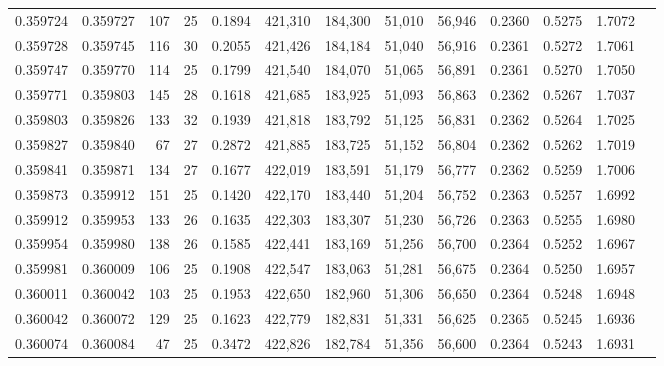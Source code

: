\begin{tabular}{rrrrrrrrrrrrr}
0.359724 & 0.359727 &   107 &  25 &                                     0.1894 & 421,310 & 184,300 &  51,010 &  56,946 & 0.2360 & 0.5275 & 1.7072 \\
0.359728 & 0.359745 &   116 &  30 &                                     0.2055 & 421,426 & 184,184 &  51,040 &  56,916 & 0.2361 & 0.5272 & 1.7061 \\
0.359747 & 0.359770 &   114 &  25 &                                     0.1799 & 421,540 & 184,070 &  51,065 &  56,891 & 0.2361 & 0.5270 & 1.7050 \\
0.359771 & 0.359803 &   145 &  28 &                                     0.1618 & 421,685 & 183,925 &  51,093 &  56,863 & 0.2362 & 0.5267 & 1.7037 \\
0.359803 & 0.359826 &   133 &  32 &                                     0.1939 & 421,818 & 183,792 &  51,125 &  56,831 & 0.2362 & 0.5264 & 1.7025 \\
0.359827 & 0.359840 &    67 &  27 &                                     0.2872 & 421,885 & 183,725 &  51,152 &  56,804 & 0.2362 & 0.5262 & 1.7019 \\
0.359841 & 0.359871 &   134 &  27 &                                     0.1677 & 422,019 & 183,591 &  51,179 &  56,777 & 0.2362 & 0.5259 & 1.7006 \\
0.359873 & 0.359912 &   151 &  25 &                                     0.1420 & 422,170 & 183,440 &  51,204 &  56,752 & 0.2363 & 0.5257 & 1.6992 \\
0.359912 & 0.359953 &   133 &  26 &                                     0.1635 & 422,303 & 183,307 &  51,230 &  56,726 & 0.2363 & 0.5255 & 1.6980 \\
0.359954 & 0.359980 &   138 &  26 &                                     0.1585 & 422,441 & 183,169 &  51,256 &  56,700 & 0.2364 & 0.5252 & 1.6967 \\
0.359981 & 0.360009 &   106 &  25 &                                     0.1908 & 422,547 & 183,063 &  51,281 &  56,675 & 0.2364 & 0.5250 & 1.6957 \\
0.360011 & 0.360042 &   103 &  25 &                                     0.1953 & 422,650 & 182,960 &  51,306 &  56,650 & 0.2364 & 0.5248 & 1.6948 \\
0.360042 & 0.360072 &   129 &  25 &                                     0.1623 & 422,779 & 182,831 &  51,331 &  56,625 & 0.2365 & 0.5245 & 1.6936 \\
0.360074 & 0.360084 &    47 &  25 &                                     0.3472 & 422,826 & 182,784 &  51,356 &  56,600 & 0.2364 & 0.5243 & 1.6931 \\

\end{tabular}
